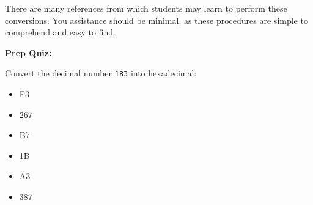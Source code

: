 





There are many references from which students may learn to perform these conversions.  You assistance should be minimal, as these procedures are simple to comprehend and easy to find.

\vfil \eject

\noindent
{\bf Prep Quiz:}

Convert the decimal number {\tt 183} into hexadecimal:

\begin{itemize}
\item{} F3
\vskip 5pt 
\item{} 267
\vskip 5pt 
\item{} B7
\vskip 5pt 
\item{} 1B
\vskip 5pt 
\item{} A3
\vskip 5pt 
\item{} 387
\end{itemize}





